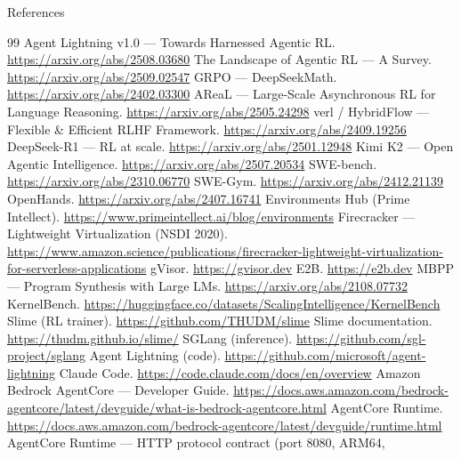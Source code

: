 \documentclass[aspectratio=169]{beamer}
\begin{document}
\begin{frame}[allowframebreaks]{References}
  \scriptsize
  \begin{thebibliography}{99}\setlength\itemsep{0.15em}
     Agent Lightning v1.0 --- Towards Harnessed Agentic RL.
      \url{https://arxiv.org/abs/2508.03680}
     The Landscape of Agentic RL --- A Survey. \url{https://arxiv.org/abs/2509.02547}
     GRPO --- DeepSeekMath. \url{https://arxiv.org/abs/2402.03300}
     AReaL --- Large-Scale Asynchronous RL for Language Reasoning.
      \url{https://arxiv.org/abs/2505.24298}
     verl / HybridFlow --- Flexible \& Efficient RLHF Framework.
      \url{https://arxiv.org/abs/2409.19256}
     DeepSeek-R1 --- RL at scale. \url{https://arxiv.org/abs/2501.12948}
     Kimi K2 --- Open Agentic Intelligence. \url{https://arxiv.org/abs/2507.20534}
     SWE-bench. \url{https://arxiv.org/abs/2310.06770}
     SWE-Gym. \url{https://arxiv.org/abs/2412.21139}
     OpenHands. \url{https://arxiv.org/abs/2407.16741}
     Environments Hub (Prime Intellect).
      \url{https://www.primeintellect.ai/blog/environments}
     Firecracker --- Lightweight Virtualization (NSDI 2020).
      \url{https://www.amazon.science/publications/firecracker-lightweight-virtualization-for-serverless-applications}
     gVisor. \url{https://gvisor.dev}
     E2B. \url{https://e2b.dev}
     MBPP --- Program Synthesis with Large LMs. \url{https://arxiv.org/abs/2108.07732}
     KernelBench.
      \url{https://huggingface.co/datasets/ScalingIntelligence/KernelBench}
     Slime (RL trainer). \url{https://github.com/THUDM/slime}
     Slime documentation. \url{https://thudm.github.io/slime/}
     SGLang (inference). \url{https://github.com/sgl-project/sglang}
     Agent Lightning (code). \url{https://github.com/microsoft/agent-lightning}
     Claude Code. \url{https://code.claude.com/docs/en/overview}
     Amazon Bedrock AgentCore --- Developer Guide.
      \url{https://docs.aws.amazon.com/bedrock-agentcore/latest/devguide/what-is-bedrock-agentcore.html}
     AgentCore Runtime.
      \url{https://docs.aws.amazon.com/bedrock-agentcore/latest/devguide/runtime.html}
     AgentCore Runtime --- HTTP protocol contract (port 8080, ARM64,

\end{thebibliography}
\end{frame}
\end{document}
